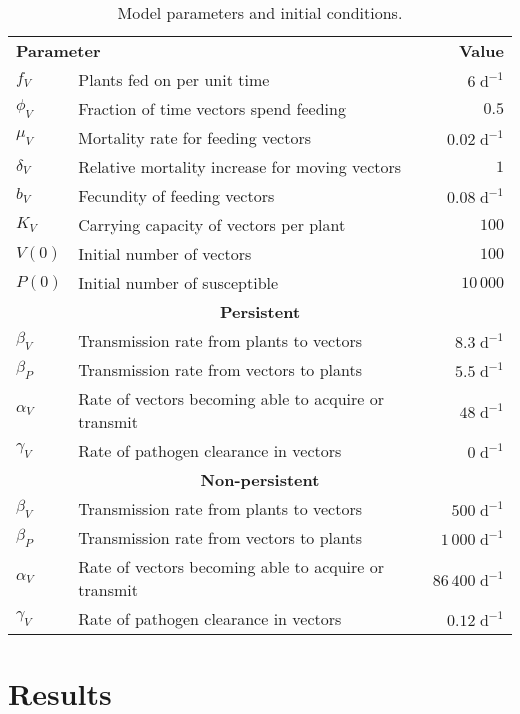 \documentclass{article}
\begin{document}
\begin{table}
  \centering
  \begin{tabular}{llr}
    \multicolumn{2}{l}{\textbf{Parameter}}
    & \multicolumn{1}{r}{\textbf{Value}}
    \\
    $f_V$ & Plants fed on per unit time & $6\;\text{d}^{-1}$
    \\
    $\phi_V$ & Fraction of time vectors spend feeding & $0.5$
    \\
    $\mu_V$ & Mortality rate for feeding vectors & $0.02\;\text{d}^{-1}$
    \\
    $\delta_V$ & Relative mortality increase for moving vectors & $1$
    \\
    $b_V$ & Fecundity of feeding vectors & $0.08\;\text{d}^{-1}$
    \\
    $K_V$ & Carrying capacity of vectors per plant & $100$
    \\
    $V(0)$ & Initial number of vectors & $100$
    \\
    $P(0)$ & Initial number of susceptible & $10\,000$
    \\
    \multicolumn{3}{c}{\textbf{Persistent}}
    \\
    $\beta_V$ & Transmission rate from plants to vectors & $8.3\;\text{d}^{-1}$
    \\
    $\beta_P$ & Transmission rate from vectors to plants & $5.5\;\text{d}^{-1}$
    \\
    $\alpha_V$ & Rate of vectors becoming able to acquire or transmit & $48\;\text{d}^{-1}$
    \\
    $\gamma_V$ & Rate of pathogen clearance in vectors & $0\;\text{d}^{-1}$
    \\
    \multicolumn{3}{c}{\textbf{Non-persistent}}
    \\
    $\beta_V$ & Transmission rate from plants to vectors & $500\;\text{d}^{-1}$
    \\
    $\beta_P$ & Transmission rate from vectors to plants & $1\,000\;\text{d}^{-1}$
    \\
    $\alpha_V$ & Rate of vectors becoming able to acquire or transmit & $86\,400\;\text{d}^{-1}$
    \\
    $\gamma_V$ & Rate of pathogen clearance in vectors & $0.12\;\text{d}^{-1}$
  \end{tabular}
  \caption{Model parameters and initial conditions.}
  \label{params}
\end{table}


\section{Results}
\end{document}
